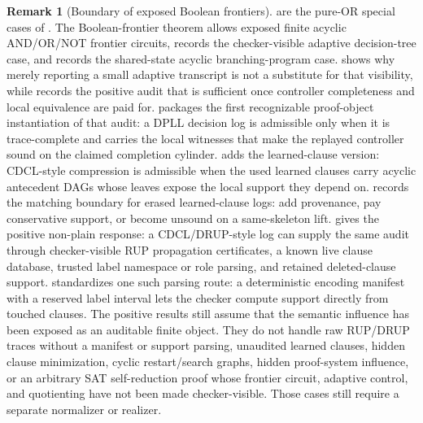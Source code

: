 \documentclass[11pt]{article}
\theoremstyle{definition}
\newtheorem{remark}[theorem]{Remark}
\begin{document}
\begin{remark}[Boundary of exposed Boolean frontiers]\label{rem:acyclic-boolean-frontier-boundary}
 are the pure-OR special cases of .  The Boolean-frontier theorem allows exposed finite acyclic AND/OR/NOT frontier circuits,  records the checker-visible adaptive decision-tree case, and  records the shared-state acyclic branching-program case.   shows why merely reporting a small adaptive transcript is not a substitute for that visibility, while  records the positive audit that is sufficient once controller completeness and local equivalence are paid for.   packages the first recognizable proof-object instantiation of that audit: a DPLL decision log is admissible only when it is trace-complete and carries the local witnesses that make the replayed controller sound on the claimed completion cylinder.   adds the learned-clause version: CDCL-style compression is admissible when the used learned clauses carry acyclic antecedent DAGs whose leaves expose the local support they depend on.   records the matching boundary for erased learned-clause logs: add provenance, pay conservative support, or become unsound on a same-skeleton lift.   gives the positive non-plain response: a CDCL/DRUP-style log can supply the same audit through checker-visible RUP propagation certificates, a known live clause database, trusted label namespace or role parsing, and retained deleted-clause support.   standardizes one such parsing route: a deterministic encoding manifest with a reserved label interval lets the checker compute support directly from touched clauses.  The positive results still assume that the semantic influence has been exposed as an auditable finite object.  They do not handle raw RUP/DRUP traces without a manifest or support parsing, unaudited learned clauses, hidden clause minimization, cyclic restart/search graphs, hidden proof-system influence, or an arbitrary SAT self-reduction proof whose frontier circuit, adaptive control, and quotienting have not been made checker-visible.  Those cases still require a separate normalizer or realizer.
\end{remark}
\end{document}

